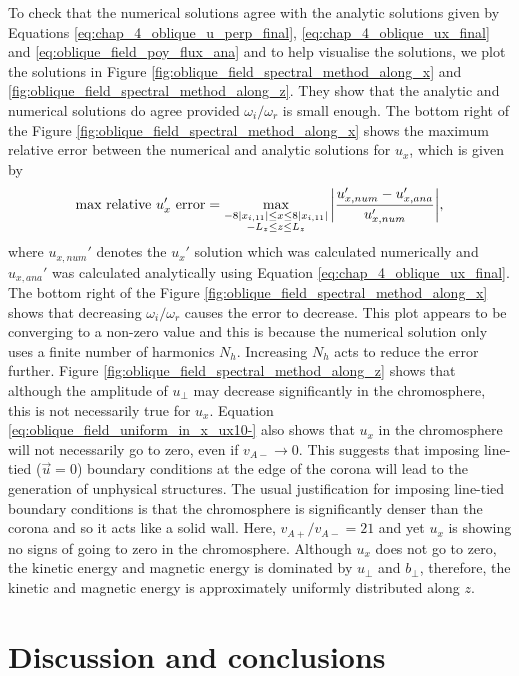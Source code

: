 To check that the numerical solutions agree with the analytic solutions given by Equations \eqref{eq:chap_4_oblique_u_perp_final}, \eqref{eq:chap_4_oblique_ux_final} and \eqref{eq:oblique_field_poy_flux_ana} and to help visualise the solutions, we plot the solutions in Figure \ref{fig:oblique_field_spectral_method_along_x} and \ref{fig:oblique_field_spectral_method_along_z}. They show that the analytic and numerical solutions do agree provided $\omega_i/\omega_r$ is small enough. The bottom right of the Figure \ref{fig:oblique_field_spectral_method_along_x} shows the maximum relative error between the numerical and analytic solutions for $u_x$, which is given by
\begin{equation}
    \text{max relative $u_x'$ error} = \max_{\substack{-8|x_{i,11}|\le x\le 8|x_{i,11}| \\ -L_z\le z \le L_z}}\abs{\frac{u_{x,num}'-u_{x,ana}'}{u_{x,num}'}},
\end{equation}
where $u_{x,num}'$ denotes the $u_x'$ solution which was calculated numerically and $u_{x,ana}'$ was calculated analytically using Equation \eqref{eq:chap_4_oblique_ux_final}. The bottom right of the Figure \ref{fig:oblique_field_spectral_method_along_x} shows that decreasing $\omega_i/\omega_r$ causes the error to decrease. This plot appears to be converging to a non-zero value and this is because the numerical solution only uses a finite number of harmonics $N_h$. Increasing $N_h$ acts to reduce the error further. Figure \ref{fig:oblique_field_spectral_method_along_z} shows that although the amplitude of $u_\perp$ may decrease significantly in the chromosphere, this is not necessarily true for $u_x$. Equation \eqref{eq:oblique_field_uniform_in_x_ux10-} also shows that $u_x$ in the chromosphere will not necessarily go to zero, even if $v_{A-}\rightarrow0$. This suggests that imposing line-tied ($\vec{u}=0$) boundary conditions at the edge of the corona will lead to the generation of unphysical structures. The usual justification for imposing line-tied boundary conditions is that the chromosphere is significantly denser than the corona and so it acts like a solid wall. Here, $v_{A+}/v_{A-}=21$ and yet $u_x$ is showing no signs of going to zero in the chromosphere. Although $u_x$ does not go to zero, the kinetic energy and magnetic energy is dominated by $u_\perp$ and $b_\perp$, therefore, the kinetic and magnetic energy is approximately uniformly distributed along $z$.

\section{Discussion and conclusions}
\label{sec:chap_4_conclusions}

